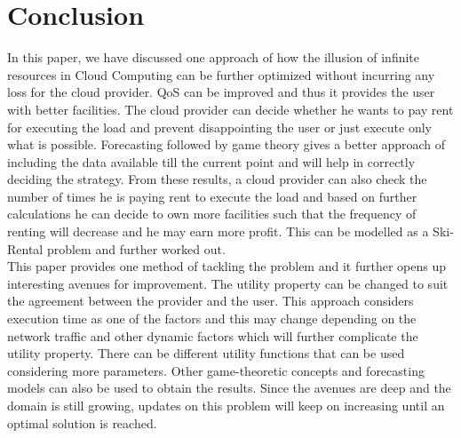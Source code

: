 \documentclass[conference]{IEEEtran}
\begin{document}
\section{Conclusion}
In this paper, we have discussed one approach of how the illusion of infinite resources in Cloud Computing can be further optimized without incurring any loss for the cloud provider. QoS can be improved and thus it provides the user with better facilities. The cloud provider can decide whether he wants to pay rent for executing the load and prevent disappointing the user or just execute only what is possible. Forecasting followed by game theory gives a better approach of including the data available till the current point and will help in correctly deciding the strategy. From these results, a cloud provider can also check the number of times he is paying rent to execute the load and based on further calculations he can decide to own more facilities such that the frequency of renting will decrease and he may earn more profit. This can be modelled as a Ski-Rental problem and further worked out.\\[0.2cm]
This paper provides one method of tackling the problem and it further opens up interesting avenues for improvement. The utility property can be changed to suit the agreement between the provider and the user. This approach considers execution time as one of the factors and this may change depending on the network traffic and other dynamic factors which will further complicate the utility property. There can be different utility functions that can be used considering more parameters. Other game-theoretic concepts and forecasting models can also be used to obtain the results. Since the avenues are deep and the domain is still growing, updates on this problem will keep on increasing until an optimal solution is reached.
\end{document}
